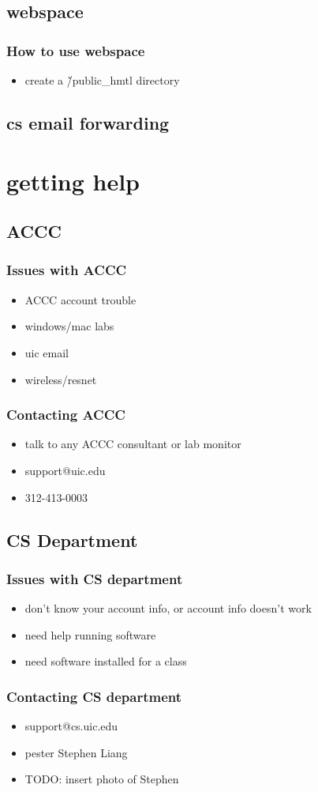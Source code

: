 \documentclass[hyperref={pdfpagelabels=false}]{beamer}
\begin{document}
\subsection{webspace}
\frame
{
    \frametitle{How to use webspace}
    \begin{itemize}
    \item{create a \~/public\_hmtl directory}
    \end{itemize}
}
\subsection{cs email forwarding}
\section{getting help}

\subsection{ACCC}
\frame
{
    \frametitle{Issues with ACCC}
    \begin{itemize}
    \item{ACCC account trouble}
    \item{windows/mac labs}
    \item{uic email}
    \item{wireless/resnet}
    \end{itemize}
}
\frame
{
    \frametitle{Contacting ACCC}
    \begin{itemize}
    \item{talk to any ACCC consultant or lab monitor}
    \item{support@uic.edu}
    \item{312-413-0003}
    \end{itemize}
}
\subsection{CS Department}
\frame
{
    \frametitle{Issues with CS department}
    \begin{itemize}
    \item{don't know your account info, or account info doesn't work}
    \item{need help running software}
    \item{need software installed for a class}
    \end{itemize}
}
\frame
{
    \frametitle{Contacting CS department}
    \begin{itemize}
    \item{support@cs.uic.edu}
    \item{pester Stephen Liang}
    \item{TODO: insert photo of Stephen}
    \end{itemize}
}
\end{document}
